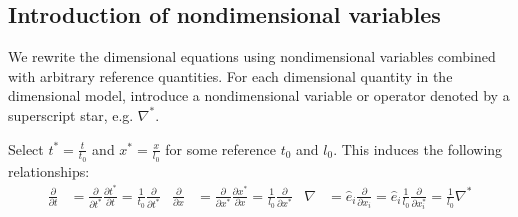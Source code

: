 \documentclass[letterpaper,11pt,nointlimits,reqno,draft]{amsbook}
\begin{document}
\subsection{Introduction of nondimensional variables}
\label{sec:intronondim}

We rewrite the dimensional equations using nondimensional variables
combined with arbitrary reference quantities.  For each dimensional
quantity in the dimensional model, introduce a nondimensional variable
or operator denoted by a superscript star, e.g. $\nabla^{*}$.

Select $t^{*}=\frac{t}{t_{0}}$ and $x^{*}=\frac{x}{l_{0}}$ for some reference
$t_{0}$ and $l_{0}$.  This induces the following relationships:
\begin{align}
  \frac{\partial{}}{\partial{}t}
  &=
  \frac{\partial{}}{\partial{}t^{*}}
  \frac{\partial{}t^{*}}{\partial{}t}
  =
  \frac{1}{t_{0}}\frac{\partial}{\partial{}t^{*}}
  &
  \frac{\partial{}}{\partial{}x}
  &=
  \frac{\partial{}}{\partial{}x^{*}}
  \frac{\partial{}x^{*}}{\partial{}x}
  =
  \frac{1}{l_{0}}\frac{\partial}{\partial{}x^{*}}
  &
  \nabla
  &=
  \hat{e}_{i} \frac{\partial{}}{\partial{}x_{i}}
  =
  \hat{e}_{i} \frac{1}{l_{0}} \frac{\partial}{\partial{}x^{*}_{i}}
  =
  \frac{1}{l_{0}} \nabla^{*}
  \label{eq:nondim_derivops}
\end{align}
\end{document}
